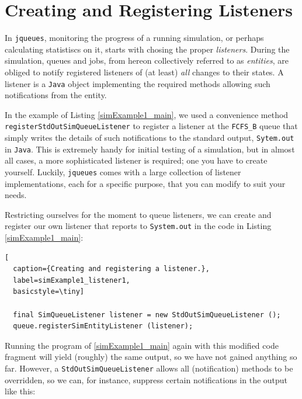 \documentclass[12pt]{book}
\begin{document}
\section{Creating and Registering Listeners}

In \lstinline|jqueues|, monitoring the progress of a running simulation,
  or perhaps calculating statistiscs on it,
  starts with chosing the proper {\em listeners}.
During the simulation,
  queues and jobs, from hereon collectively referred to as {\em entities},
  are obliged to notify registered listeners of (at least) {\em all\/}
  changes to their states.
A listener is a \lstinline|Java| object implementing the required methods
  allowing such notifications from the entity.

In the example of Listing \ref{simExample1_main},
  we used a convenience method \lstinline|registerStdOutSimQueueListener|
  to register a listener at the \lstinline|FCFS_B| queue
  that simply writes the details of such notifications
  to the standard output, \lstinline|Sytem.out| in \lstinline|Java|.
This is extremely handy for initial testing of a simulation,
  but in almost all cases,
  a more sophisticated listener is required;
  one you have to create yourself.
Luckily, \lstinline|jqueues| comes with a large collection of
  listener implementations, each for a specific purpose, that
  you can modify to suit your needs.

Restricting ourselves for the moment to queue listeners,
  we can create and register
  our own listener that reports to \lstinline|System.out|
  in the code in Listing \ref{simExample1_main}:

\begin{lstfloat}
\begin{lstlisting}[
  caption={Creating and registering a listener.},
  label=simExample1_listener1,
  basicstyle=\tiny]

  final SimQueueListener listener = new StdOutSimQueueListener ();
  queue.registerSimEntityListener (listener);

\end{lstlisting}
\end{lstfloat}

Running the program of \ref{simExample1_main} again with
  this modified code fragment will yield (roughly)
  the same output, so we have not gained anything so far.
However,
  a \lstinline|StdOutSimQueueListener| allows
  all (notification) methods to be overridden,
  so we can, for instance,
  suppress certain notifications in the output like this:
\end{document}
